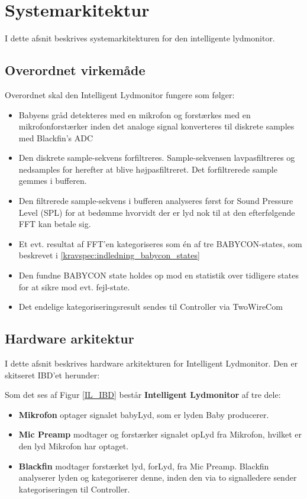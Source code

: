 \newpage
\section{Systemarkitektur}

I dette afsnit beskrives systemarkitekturen for den intelligente lydmonitor.

\subsection*{Overordnet virkemåde}
Overordnet skal den Intelligent Lydmonitor fungere som følger:
\begin{itemize}
	\item Babyens gråd detekteres med en mikrofon og forstærkes med en mikrofonforstærker inden det analoge signal konverteres til diskrete samples med Blackfin's ADC
	\item Den diskrete sample-sekvens forfiltreres. Sample-sekvensen lavpasfiltreres og nedsamples for herefter at blive højpasfiltreret. Det forfiltrerede sample gemmes i bufferen.
	\item Den filtrerede sample-sekvens i bufferen analyseres først for Sound Pressure Level (SPL) for at bedømme hvorvidt der er lyd nok til at den efterfølgende FFT kan betale sig. 
	\item Et evt. resultat af FFT'en kategoriseres som én af tre BABYCON-states, som beskrevet i \ref{kravspec:indledning_babycon_states} 
	\item Den fundne BABYCON state holdes op mod en statistik over tidligere states for at sikre mod evt. fejl-state.
	\item Det endelige kategoriseringsresult sendes til Controller via TwoWireCom
\end{itemize}


\newpage
\subsection{Hardware arkitektur}
I dette afsnit beskrives hardware arkitekturen for Intelligent Lydmonitor. Den er skitseret IBD'et herunder:

Som det ses af Figur \ref{IL_IBD} består \textbf{Intelligent Lydmonitor} af tre dele: 
\begin{itemize}
\item \textbf{Mikrofon} optager signalet babyLyd, som er lyden Baby producerer. 
\item \textbf{Mic Preamp} modtager og forstærker signalet opLyd fra Mikrofon, hvilket er den lyd Mikrofon har optaget. 
\item \textbf{Blackfin} modtager forstærket lyd, forLyd, fra Mic Preamp. Blackfin analyserer lyden og kategoriserer denne, inden den via to signalledere sender kategoriseringen til Controller. 
\end{itemize}

